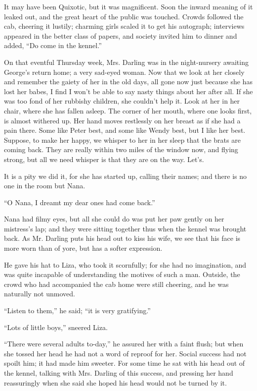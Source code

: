 It may have been Quixotic, but it was magnificent. Soon the inward
meaning of it leaked out, and the great heart of the public was
touched. Crowds followed the cab, cheering it lustily; charming girls
scaled it to get his autograph; interviews appeared in the better class
of papers, and society invited him to dinner and added, ``Do come in the
kennel.''

On that eventful Thursday week, Mrs. Darling was in the night-nursery
awaiting George's return home; a very sad-eyed woman. Now that we look
at her closely and remember the gaiety of her in the old days, all gone
now just because she has lost her babes, I find I won't be able to say
nasty things about her after all. If she was too fond of her rubbishy
children, she couldn't help it. Look at her in her chair, where she has
fallen asleep. The corner of her mouth, where one looks first, is
almost withered up. Her hand moves restlessly on her breast as if she
had a pain there. Some like Peter best, and some like Wendy best, but I
like her best. Suppose, to make her happy, we whisper to her in her
sleep that the brats are coming back. They are really within two miles
of the window now, and flying strong, but all we need whisper is that
they are on the way. Let's.

It is a pity we did it, for she has started up, calling their names;
and there is no one in the room but Nana.

``O Nana, I dreamt my dear ones had come back.''

Nana had filmy eyes, but all she could do was put her paw gently on her
mistress's lap; and they were sitting together thus when the kennel was
brought back. As Mr. Darling puts his head out to kiss his wife, we see
that his face is more worn than of yore, but has a softer expression.

He gave his hat to Liza, who took it scornfully; for she had no
imagination, and was quite incapable of understanding the motives of
such a man. Outside, the crowd who had accompanied the cab home were
still cheering, and he was naturally not unmoved.

``Listen to them,'' he said; ``it is very gratifying.''

``Lots of little boys,'' sneered Liza.

``There were several adults to-day,'' he assured her with a faint flush;
but when she tossed her head he had not a word of reproof for her.
Social success had not spoilt him; it had made him sweeter. For some
time he sat with his head out of the kennel, talking with Mrs. Darling
of this success, and pressing her hand reassuringly when she said she
hoped his head would not be turned by it.

